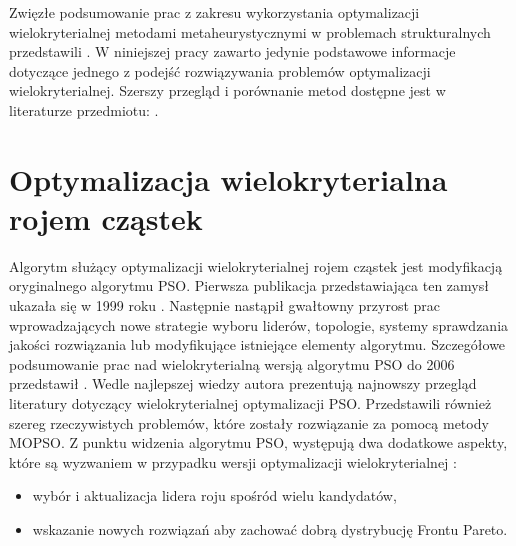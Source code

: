Zwięzłe podsumowanie prac z zakresu wykorzystania optymalizacji wielokryterialnej metodami metaheurystycznymi w problemach strukturalnych przedstawili \parencite{Zavala2014}. W niniejszej pracy zawarto jedynie podstawowe informacje dotyczące jednego z podejść rozwiązywania problemów optymalizacji wielokryterialnej. Szerszy przegląd i porównanie metod dostępne jest w literaturze przedmiotu: \parencite{Miettinen1999,Zitzler2000,Elbeltagi2005,Abido2006,Coello2007,Lalwani2013,Zaman2019}. 

\section{Optymalizacja wielokryterialna rojem cząstek}
Algorytm służący optymalizacji wielokryterialnej rojem cząstek  jest modyfikacją oryginalnego algorytmu PSO. Pierwsza publikacja przedstawiająca ten zamysł ukazała się w 1999 roku \parencite{Moore1999}. Następnie nastąpił gwałtowny przyrost prac wprowadzających nowe strategie wyboru liderów, topologie, systemy sprawdzania jakości rozwiązania lub modyfikujące istniejące elementy algorytmu. Szczegółowe podsumowanie prac nad wielokryterialną wersją algorytmu PSO do 2006 przedstawił \parencite{CoelloCoello2006}. Wedle najlepszej wiedzy autora \cite{Lalwani2013} prezentują najnowszy przegląd literatury dotyczący wielokryterialnej optymalizacji PSO. Przedstawili również szereg rzeczywistych problemów, które zostały rozwiązanie za pomocą metody MOPSO.
Z punktu widzenia algorytmu PSO, występują dwa dodatkowe aspekty, które są wyzwaniem w przypadku wersji optymalizacji wielokryterialnej \parencite{Pulido2005OnTU}:
\begin{itemize}
	\item wybór i aktualizacja lidera roju spośród wielu kandydatów,
	\item wskazanie nowych rozwiązań aby zachować dobrą dystrybucję Frontu Pareto.
\end{itemize}
